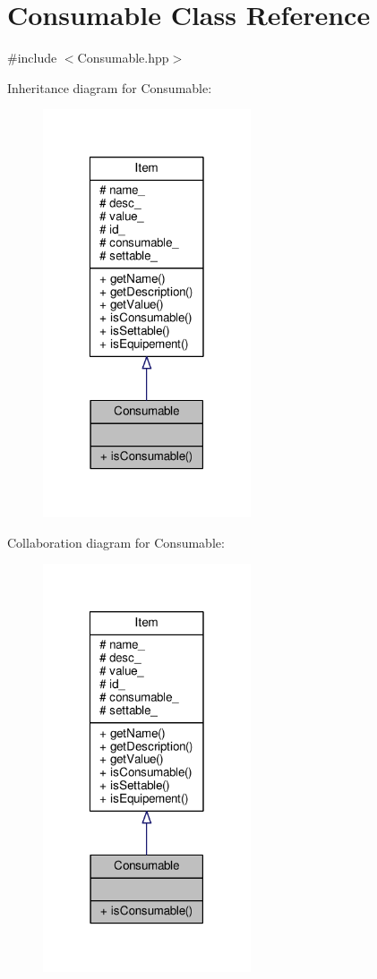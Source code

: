 \hypertarget{class_consumable}{\section{Consumable Class Reference}
\label{class_consumable}
}


{\ttfamily \#include $<$Consumable.\-hpp$>$}



Inheritance diagram for Consumable\-:\nopagebreak
\begin{figure}[H]
\begin{center}
\leavevmode
\includegraphics[width=174pt]{class_consumable__inherit__graph}
\end{center}
\end{figure}


Collaboration diagram for Consumable\-:\nopagebreak
\begin{figure}[H]
\begin{center}
\leavevmode
\includegraphics[width=174pt]{class_consumable__coll__graph}
\end{center}
\end{figure}
